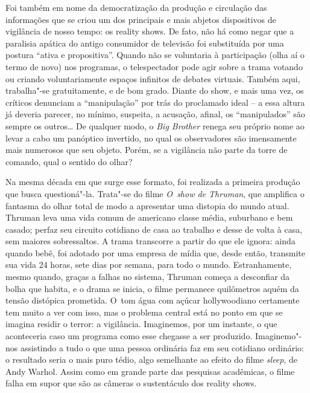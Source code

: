 \begin{center}
\end{center}

Foi também em nome da democratização da produção e circulação das
informações que se criou um dos principais e mais abjetos dispositivos
de vigilância de nosso tempo: os reality shows. De fato, não há como
negar que a paralisia apática do antigo consumidor de televisão foi
substituída por uma postura ``ativa e propositiva''. Quando não se
voluntaria à participação (olha aí o termo de novo) nos programas, o
telespectador pode agir sobre a trama votando ou criando voluntariamente
espaços infinitos de debates virtuais. Também aqui, trabalha"-se
gratuitamente, e de bom grado. Diante do show, e mais uma vez, os
críticos denunciam a ``manipulação'' por trás do proclamado ideal -- a
essa altura já deveria parecer, no mínimo, suspeita, a acusação, afinal,
os ``manipulados'' são sempre os outros\ldots{} De qualquer modo, o \emph{Big
Brother} renega seu próprio nome ao levar a cabo um panóptico invertido,
no qual os observadores são imensamente mais numerosos que seu objeto.
Porém, se a vigilância não parte da torre de comando, qual o sentido do
olhar?

Na mesma década em que surge esse formato, foi realizada a primeira
produção que busca questioná"-la. Trata"-se do filme \emph{O~show de
Thruman}, que amplifica o fantasma do olhar total de modo a apresentar
uma distopia do mundo atual. Thruman leva uma vida comum de americano
classe média, suburbano e bem casado; perfaz seu circuito cotidiano de
casa ao trabalho e desse de volta à casa, sem maiores sobressaltos. A
trama transcorre a partir do que ele ignora: ainda quando bebê, foi
adotado por uma empresa de mídia que, desde então, transmite sua vida 24
horas, sete dias por semana, para todo o mundo. Estranhamente, mesmo
quando, graças a falhas no sistema, Thruman começa a desconfiar da bolha
que habita, e o drama se inicia, o filme permanece quilômetros aquém da
tensão distópica prometida. O~tom água com açúcar hollywoodiano
certamente tem muito a ver com isso, mas o problema central está no
ponto em que se imagina residir o terror: a vigilância. Imaginemos, por
um instante, o que aconteceria caso um programa como esse chegasse a ser
produzido. Imaginemo"-nos assistindo a tudo o que uma pessoa ordinária
faz em seu cotidiano ordinário: o resultado seria o mais puro tédio,
algo semelhante ao efeito do filme \emph{sleep}, de Andy Warhol. Assim
como em grande parte das pesquisas acadêmicas, o filme falha em supor
que são as câmeras o sustentáculo dos reality shows.

